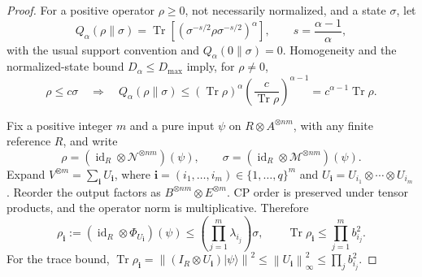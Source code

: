 \documentclass[11pt,letterpaper]{article}
\numberwithin{equation}{section}
\newcommand{\N}{\mathcal N}
\newcommand{\M}{\mathcal M}
\newcommand{\id}{\operatorname{id}}
\newcommand{\Tr}{\operatorname{Tr}}
\newcommand{\Dt}{D}
\newcommand{\Qt}{Q}
\newcommand{\norm}[1]{\left\lVert#1\right\rVert}
\begin{document}
\begin{proof}
For a positive operator $\rho\ge0$, not necessarily normalized, and a state $\sigma$, let
\begin{equation}\label{eq:Q}
 \Qt_\alpha(\rho\|\sigma)
 =\Tr\left[\left(\sigma^{-s/2}\rho\sigma^{-s/2}\right)^\alpha\right],
 \qquad s=\frac{\alpha-1}{\alpha},
\end{equation}
with the usual support convention and $\Qt_\alpha(0\|\sigma)=0$. Homogeneity and the normalized-state bound $\Dt_\alpha\le D_{\max}$ imply, for $\rho\ne0$,
\begin{equation}\label{eq:Qbound}
 \rho\le c\sigma\quad\Longrightarrow\quad
 \Qt_\alpha(\rho\|\sigma)
 \le(\Tr\rho)^\alpha\left(\frac{c}{\Tr\rho}\right)^{\alpha-1}
 =c^{\alpha-1}\Tr\rho.
\end{equation}

Fix a positive integer $m$ and a pure input $\psi$ on $R\otimes A^{\otimes nm}$, with any finite reference $R$, and write
\[
 \rho=(\id_R\otimes\N^{\otimes nm})(\psi),\qquad
 \sigma=(\id_R\otimes\M^{\otimes nm})(\psi).
\]
Expand $V^{\otimes m}=\sum_{\mathbf i}U_{\mathbf i}$, where
$\mathbf i=(i_1,\ldots,i_m)\in\{1,\ldots,q\}^m$ and
$U_{\mathbf i}=U_{i_1}\otimes\cdots\otimes U_{i_m}$.
Reorder the output factors as $B^{\otimes nm}\otimes E^{\otimes m}$.
CP order is preserved under tensor products, and the operator norm is multiplicative. Therefore
\begin{equation}\label{eq:wordbounds}
 \rho_{\mathbf i}:=(\id_R\otimes\Phi_{U_{\mathbf i}})(\psi)
 \le\left(\prod_{j=1}^m\lambda_{i_j}\right)\sigma,
 \qquad
 \Tr \rho_{\mathbf i}\le\prod_{j=1}^m b_{i_j}^2.
\end{equation}
For the trace bound, $\Tr\rho_{\mathbf i}=\norm{(I_R\otimes U_{\mathbf i})|\psi\rangle}^2\le\norm{U_{\mathbf i}}_\infty^2\le\prod_j b_{i_j}^2$.


\end{proof}
\end{document}
